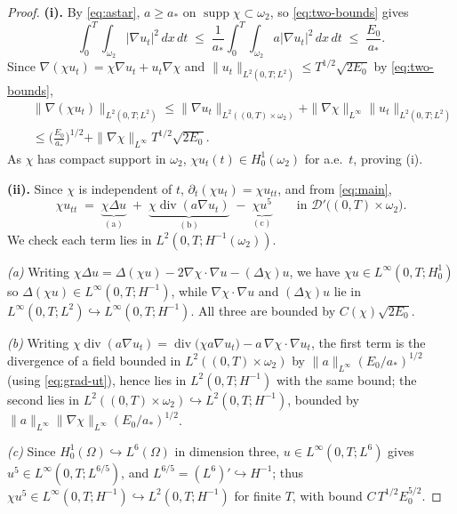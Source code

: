 \documentclass[10pt,a4paper]{amsart}
\newcommand{\Om}{\Omega}
\newcommand{\dive}{\operatorname{div}}
\begin{document}
\begin{proof}
\textbf{(i).} By \eqref{eq:astar}, $a\ge a_*$ on $\operatorname{supp}\chi\subset\omega_2$, so
\eqref{eq:two-bounds} gives
\begin{equation}\label{eq:grad-ut}
\int_0^{T}\!\!\int_{\omega_2}|\nabla u_t|^2\,dx\,dt
\;\le\; \frac1{a_*}\int_0^{T}\!\!\int_{\omega_2}a|\nabla u_t|^2\,dx\,dt \;\le\; \frac{E_0}{a_*}.
\end{equation}
Since $\nabla(\chi u_t)=\chi\nabla u_t+u_t\nabla\chi$ and
$\|u_t\|_{L^2(0,T;L^2)}\le T^{1/2}\sqrt{2E_0}$ by \eqref{eq:two-bounds},
\begin{eqnarray*}
&&\|\nabla(\chi u_t)\|_{L^2(0,T;L^2)}\le \|\nabla u_t\|_{L^2((0,T)\times\omega_2)}
+\|\nabla\chi\|_{L^\infty}\|u_t\|_{L^2(0,T;L^2)}\\
&&\le \Big(\frac{E_0}{a_*}\Big)^{1/2}+\|\nabla\chi\|_{L^\infty}T^{1/2}\sqrt{2E_0}.
\end{eqnarray*}
As $\chi$ has compact support in $\omega_2$, $\chi u_t(t)\in H_0^1(\omega_2)$ for a.e.\ $t$,
proving (i).

\textbf{(ii).} Since $\chi$ is independent of $t$, $\partial_t(\chi u_t)=\chi u_{tt}$, and from
\eqref{eq:main},
\begin{equation}\label{eq:three-terms}
\chi u_{tt} \;=\; \underbrace{\chi\Delta u}_{(\mathrm a)} \;+\; \underbrace{\chi\dive(a\nabla u_t)}_{(\mathrm b)} \;-\; \underbrace{\chi u^5}_{(\mathrm c)}
\qquad\text{in }\mathcal D'\big((0,T)\times\omega_2\big).
\end{equation}
We check each term lies in $L^2(0,T;H^{-1}(\omega_2))$.

\emph{(a)} Writing $\chi\Delta u=\Delta(\chi u)-2\nabla\chi\cdot\nabla u-(\Delta\chi)u$, we have
$\chi u\in L^\infty(0,T;H_0^1)$ so $\Delta(\chi u)\in L^\infty(0,T;H^{-1})$, while
$\nabla\chi\cdot\nabla u$ and $(\Delta\chi)u$ lie in $L^\infty(0,T;L^2)\hookrightarrow
L^\infty(0,T;H^{-1})$. All three are bounded by $C(\chi)\sqrt{2E_0}$.

\emph{(b)} Writing $\chi\dive(a\nabla u_t)=\dive\big(\chi a\nabla u_t\big)-a\,\nabla\chi\cdot\nabla u_t$,
the first term is the divergence of a field bounded in $L^2((0,T)\times\omega_2)$ by
$\|a\|_{L^\infty}(E_0/a_*)^{1/2}$ (using \eqref{eq:grad-ut}), hence lies in $L^2(0,T;H^{-1})$ with
the same bound; the second lies in $L^2((0,T)\times\omega_2)\hookrightarrow L^2(0,T;H^{-1})$,
bounded by $\|a\|_{L^\infty}\|\nabla\chi\|_{L^\infty}(E_0/a_*)^{1/2}$.

\emph{(c)} Since $H_0^1(\Om)\hookrightarrow L^6(\Om)$ in dimension three,
$u\in L^\infty(0,T;L^6)$ gives $u^5\in L^\infty(0,T;L^{6/5})$, and $L^{6/5}=(L^6)'\hookrightarrow
H^{-1}$; thus $\chi u^5\in L^\infty(0,T;H^{-1})\hookrightarrow L^2(0,T;H^{-1})$ for finite $T$,
with bound $C\,T^{1/2}E_0^{5/2}$.


\end{proof}
\end{document}
